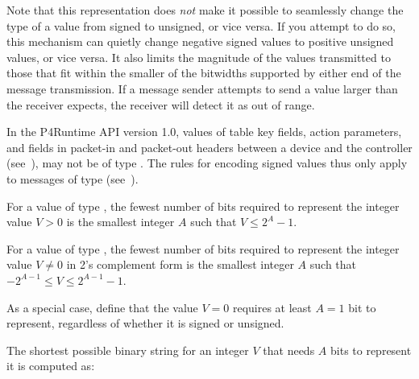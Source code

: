 \documentclass[11pt]{article}
\begin{document}
{%
Note that this representation does \emph{not} make it possible to seamlessly change
the type of a value from signed to unsigned, or vice versa.  If you attempt to
do so, this mechanism can quietly change negative signed values to positive
unsigned values, or vice versa.  It also limits the magnitude of the values
transmitted to those that fit within the smaller of the bitwidths supported by
either end of the message transmission.  If a message sender attempts to send a
value larger than the receiver expects, the receiver will detect it as out of
range.%

In the P4Runtime API version 1.0, values of table key fields, action parameters,
and fields in packet-in and packet-out headers between a device and the
controller (see~), may not be of type .
The rules for encoding signed values thus only apply to messages of type
 (see~).%

For a value of type , the fewest number of bits required to represent
the integer value $V > 0$ is the smallest integer $A$ such that $V \leq 2^A -1$.%

For a value of type , the fewest number of bits required to represent
the integer value $V \neq 0$ in 2's complement form is the smallest integer $A$
such that $-2^{A-1} \leq V \leq 2^{A-1} - 1$.%

As a special case, define that the value $V=0$ requires at least $A=1$ bit to
represent, regardless of whether it is signed or unsigned.%

The shortest possible binary string for an integer $V$ that needs $A$ bits to
represent it is computed as:%

}
\end{document}
